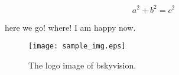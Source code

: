 \documentclass{article}
\begin{document}
    \lipsum[1]
    \[
        a^2 + b^2 = c^2
    \]
    \lipsum[2]

    here we go!
    where!
    I am happy now.

    \begin{figure}[!htbp]
        \centering
           \texttt{[image: sample\_img.eps]}
           \hfil
        \caption{The logo image of bskyvision.}
        \label{logo}
    \end{figure}
\end{document}
